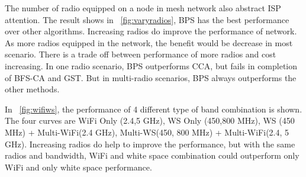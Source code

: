 

The number of radio equipped on a node in mesh network also abstract ISP attention. 
The result shows in ~\ref{fig:varyradios}, BPS has the best performance over other algorithms. 
Increasing radios do improve the performance of network. 
As more radios equipped in the network, the benefit would be decrease in most scenario. 
There is a trade off between performance of more radios and cost increasing.
In one radio scenario, BPS outperforms CCA, but fails in completion of BFS-CA and GST.
But in multi-radio scenarios, BPS always outperforms the other methods.







In ~\ref{fig:wifiws}, the performance of 4 different type of band combination is shown. 
The four curves are WiFi Only (2.4,5 GHz), WS Only (450,800 MHz), WS (450 MHz) + Multi-WiFi(2.4 GHz), Multi-WS(450, 800 MHz) + Multi-WiFi(2.4, 5 GHz). 
Increasing radios do help to improve the performance, but with the same radios and bandwidth, WiFi and white space combination could outperform only WiFi and only white space performance.

